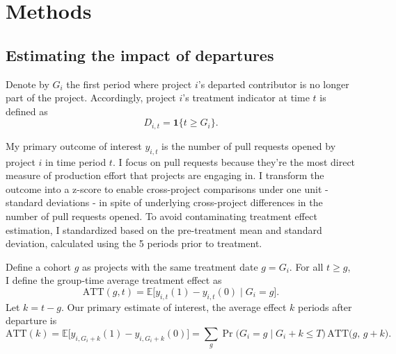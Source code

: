 \documentclass[12pt,notitlepage]{article}
\begin{document}
\section{Methods} \label{sec:method}
\subsection{Estimating the impact of departures} \label{sec:main_method}
Denote by $G_i$ the first period where project $i$'s departed contributor is no longer part of the project. Accordingly, project $i$'s treatment indicator at time $t$ is defined as
$$
D_{i,t} = \mathbf{1}\{t \ge G_i\}.
$$

My primary outcome of interest $y_{i,t}$ is the number of pull requests opened by project $i$ in time period $t$. I focus on pull requests because they're the most direct measure of production effort that projects are engaging in. I transform the outcome into a z-score to enable cross-project comparisons under one unit - standard deviations - in spite of underlying cross-project differences in the number of pull requests opened. To avoid contaminating treatment effect estimation, I standardized based on the pre-treatment mean and standard deviation, calculated using the 5 periods prior to treatment.

Define a cohort $g$ as projects with the same treatment date $g = G_i$. For all $t \geq g$, I define the group‐time average treatment effect as 
\begin{equation} \label{eq:group_time}
\mathrm{ATT}(g,t) = \mathbb{E}\bigl [ y_{i,t}(1)-y_{i,t}(0)\mid G_i = g \bigr ].
\end{equation}
Let $k = t - g$. Our primary estimate of interest, the average effect \(k\) periods after departure is
\begin{equation}\label{eq:event_study_time}
\mathrm{ATT}(k) =
\mathbb{E}\bigl[y_{i,G_i+k}(1)-y_{i,G_i+k}(0)\bigr] = 
\sum_{g} \Pr\!\bigl(G_i = g \mid G_i + k \le T\bigr)\,\mathrm{ATT}\bigl(g,\,g+k\bigr).
\end{equation}
\end{document}

